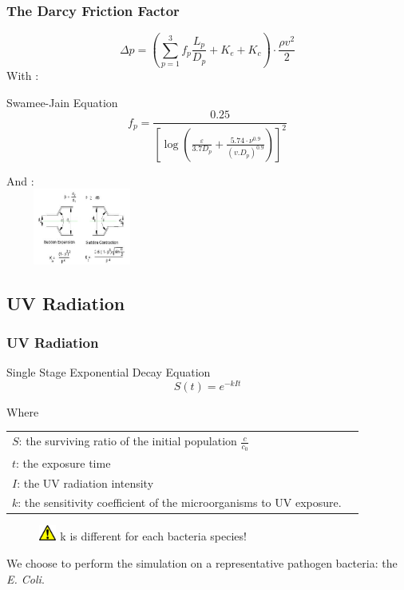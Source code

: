 \documentclass[xcolor=dvipsnames,10pt]{beamer}
\begin{document}
\begin{frame}
\frametitle{The Darcy Friction Factor}
	\begin{equation}
		\Delta p = \left(\sum_{p=1}^3 f_p\frac{L_p}{D_p} + K_e + K_c\right)\cdot \frac{\rho v^2}{2}
	\end{equation}
With : \\
\begin{block}{Swamee-Jain Equation}
\begin{equation}
	f_p = \frac{0.25}{[\log (\frac{\varepsilon}{3.7 D_p} + \frac{5.74\cdot \nu^{0.9}}{(v.D_p)^{0.9}})]^2}
\end{equation}
\end{block}
And : \\
\hspace{20mm}
\includegraphics[height=25mm, width=5cm]{./images/fitting.JPG}
\end{frame}


\subsection{UV Radiation}

\begin{frame}
	\frametitle{UV Radiation}
\begin{block}{Single Stage Exponential Decay Equation}
	\begin{equation}
		S(t)=e^{-kIt}
	\end{equation}
\end{block}
Where 
	\begin{tabular}{ll}
		$S$: the surviving ratio of the initial population $\frac{c}{c_0}$\\
		$t$: the exposure time\\
		$I$: the UV radiation intensity\\
		$k$: the sensitivity coefficient of the microorganisms to UV exposure.
	\end{tabular}

\begin{figure}
	\raggedright
	\includegraphics[height=0.5cm, width=0.6cm]{./images/warn.jpg}
\hspace{1mm} k is different for each bacteria species!
	\end{figure}
\vspace{2mm}
We choose to perform the simulation on a representative pathogen bacteria: the \textit{E. Coli}.
\end{frame}
\end{document}

